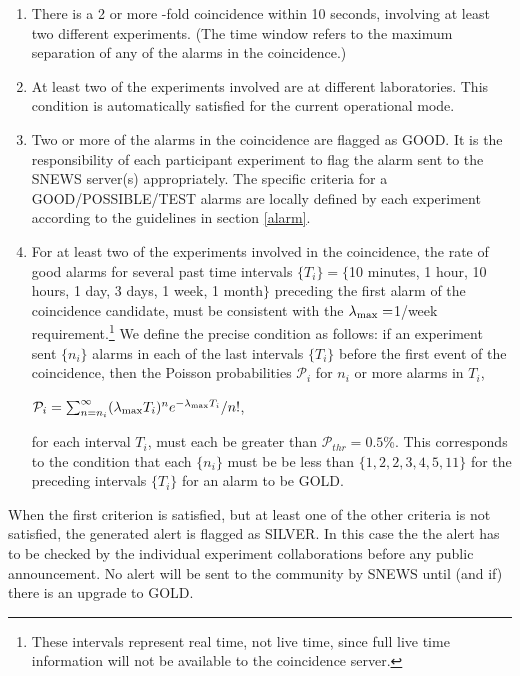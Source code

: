 \documentclass{article}
\begin{document}
\begin{enumerate}

\item There is a 2 or more -fold coincidence within 10 seconds,
involving at least two different experiments. 
(The time window refers to the maximum
separation of any of the alarms in the coincidence.)

\item At least two of the experiments involved
are at different laboratories.  This condition is automatically
satisfied for the current operational mode.

\item Two or more of the alarms in the coincidence
are flagged as GOOD.  It is the responsibility of each participant
experiment to flag the alarm sent to the SNEWS server(s)
appropriately. The specific criteria for a GOOD/POSSIBLE/TEST alarms
are locally defined by each experiment according to the guidelines 
in section \ref{alarm}.
  
 \item For at least two of the experiments involved in the
 coincidence, the rate of good alarms for several past time intervals
 $\{T_i\}=\{$10 minutes, 1 hour, 10 hours, 1 day, 3 days, 1 week, 1
 month$\}$ preceding the first alarm of the coincidence candidate, 
 must be consistent with the $\lambda_{\rm{max}}=$1/week
 requirement.\footnote{These intervals represent real time, not live
 time, since full live time information will not be available to the
 coincidence server.}  We define the precise condition as follows: if
 an experiment sent $\{n_i\}$ alarms in each of the last intervals
 $\{T_i\}$ before the first event of the coincidence, then the Poisson probabilities $\mathcal{P}_i$ for $n_i$
 or more alarms in $T_i$,

$\mathcal{P}_i=\sum_{n=n_i}^{\infty}(\lambda_{\rm{max}} T_i)^{n}e^{-\lambda_{\rm{max}} T_i}/n!$,

for each interval $T_i$, must each be greater than $\mathcal{P}_{thr}=0.5$\%.
This corresponds to the condition that each $\{n_i\}$ must be be less
than $\{1,2,2,3,4,5,11\}$ for the preceding intervals $\{T_i\}$ for an
alarm to be GOLD.

\end{enumerate}

When the first criterion is satisfied, but at least one of the other
criteria is not satisfied, the generated alert is flagged as SILVER.
In this case the the alert has to be checked by the individual
experiment collaborations before any public announcement. No alert
will be sent to the community by SNEWS until (and if) there is an
upgrade to GOLD.
\end{document}

